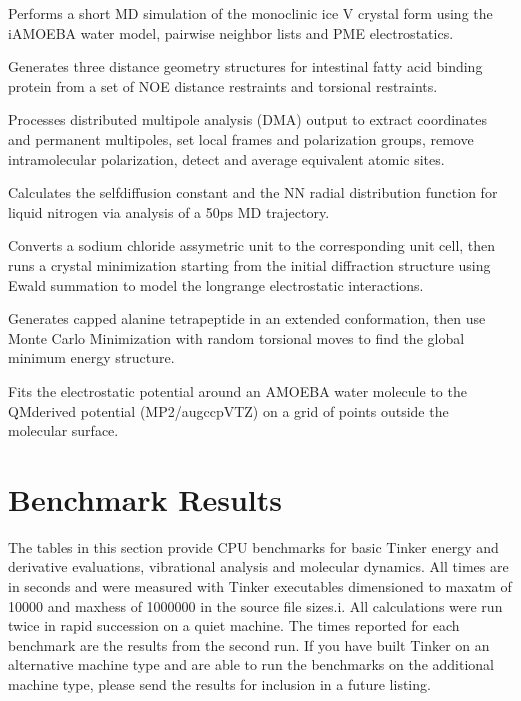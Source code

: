 \documentclass[letterpaper,11pt,english]{sphinxmanual}
\begin{document}
Performs a short MD simulation of the monoclinic ice V crystal form using the iAMOEBA water model, pairwise neighbor lists and PME electrostatics.


Generates three distance geometry structures for intestinal fatty acid binding protein from a set of NOE distance restraints and torsional restraints.


Processes distributed multipole analysis (DMA) output to extract coordinates and permanent multipoles, set local frames and polarization groups, remove intramolecular polarization, detect and average equivalent atomic sites.


Calculates the self\sphinxhyphen{}diffusion constant and the N\sphinxhyphen{}N radial distribution function for liquid nitrogen via analysis of a 50ps MD trajectory.


Converts a sodium chloride assymetric unit to the corresponding unit cell, then runs a crystal minimization starting from the initial diffraction structure using Ewald summation to model the long\sphinxhyphen{}range electrostatic interactions.


Generates capped alanine tetrapeptide in an extended conformation, then use Monte Carlo Minimization with random torsional moves to find the global minimum energy structure.


Fits the electrostatic potential around an AMOEBA water molecule to the QM\sphinxhyphen{}derived potential (MP2/aug\sphinxhyphen{}cc\sphinxhyphen{}pVTZ) on a grid of points outside the molecular surface.


\chapter{Benchmark Results}
\label{\detokenize{text/benchmarks:benchmark-results}}\label{\detokenize{text/benchmarks::doc}}
The tables in this section provide CPU benchmarks for basic Tinker energy and derivative evaluations, vibrational analysis and molecular dynamics. All times are in seconds and were measured with Tinker executables dimensioned to maxatm of 10000 and maxhess of 1000000 in the source file sizes.i. All calculations were run twice in rapid succession on a quiet machine. The times reported for each benchmark are the results from the second run. If you have built Tinker on an alternative machine type and are able to run the benchmarks on the additional machine type, please send the results for inclusion in a future listing.
\end{document}
